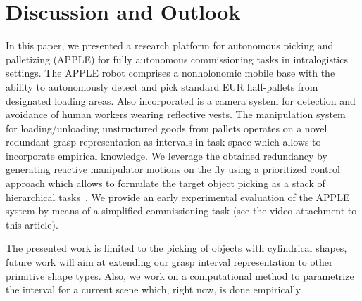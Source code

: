\section{Discussion and Outlook}
\label{sec:discussion}
%
In this paper, we presented a research platform for autonomous picking and palletizing (APPLE) for
fully autonomous commissioning tasks in intralogistics settings. The APPLE robot comprises a
nonholonomic mobile base with the ability to autonomously detect and pick standard EUR half-pallets
from designated loading areas. Also incorporated is a camera system for detection and avoidance of
human workers wearing reflective vests. The manipulation system for loading/unloading unstructured
goods from pallets operates on a novel redundant grasp representation as intervals in task space
which allows to incorporate empirical knowledge. We leverage the obtained redundancy by generating
reactive manipulator motions on the fly using a prioritized control approach which allows to
formulate the target object picking as a stack of hierarchical tasks~\cite{Kano11}. We provide an
early experimental evaluation of the APPLE system by means of a simplified commissioning task (see
the video attachment to this article).

The presented work is limited to the picking of objects with cylindrical shapes, future work will
aim at extending our grasp interval representation to other primitive shape types. Also, we work on
a computational method to parametrize the interval for a current scene which, right now, is done
empirically. 


